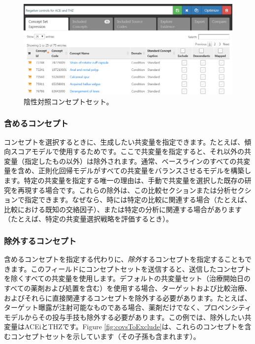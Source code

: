 \documentclass[
  11pt]{book}
\theoremstyle{definition}
\theoremstyle{definition}
\theoremstyle{definition}
\theoremstyle{definition}
\theoremstyle{remark}
\begin{document}
\begin{figure}

{\centering \includegraphics[width=1\linewidth]{images/PopulationLevelEstimation/ncConceptSet} 

}

\caption{陰性対照コンセプトセット。}\label{fig:ncConceptSet}
\end{figure}

\subsubsection*{含めるコンセプト}\label{ux542bux3081ux308bux30b3ux30f3ux30bbux30d7ux30c8}

コンセプトを選択するときに、生成したい共変量を指定できます。たとえば、傾向スコアモデルで使用するためです。ここで共変量を指定すると、それ以外の共変量（指定したもの以外）は除外されます。通常、ベースラインのすべての共変量を含め、正則化回帰モデルがすべての共変量をバランスさせるモデルを構築します。特定の共変量を指定する唯一の理由は、手動で共変量を選択した既存の研究を再現する場合です。これらの除外は、この比較セクションまたは分析セクションで指定できます。なぜなら、時には特定の比較に関連する場合（たとえば、比較における既知の交絡因子）、または特定の分析に関連する場合があります（たとえば、特定の共変量選択戦略を評価するとき）。

\subsubsection*{除外するコンセプト}\label{ux9664ux5916ux3059ux308bux30b3ux30f3ux30bbux30d7ux30c8}

含めるコンセプトを指定する代わりに、\emph{除外}するコンセプトを指定することもできます。このフィールドにコンセプトセットを送信すると、送信したコンセプトを除くすべての共変量を使用します。デフォルトの共変量セット（治療開始日のすべての薬剤および処置を含む）を使用する場合、ターゲットおよび比較治療、およびそれらに直接関連するコンセプトを除外する必要があります。たとえば、ターゲット曝露が注射可能なものである場合、薬剤だけでなく、プロペンシティモデルからその投与手技も除外する必要があります。この例では、除外したい共変量はACEiとTHZです。Figure \ref{fig:covsToExclude}は、これらのコンセプトを含むコンセプトセットを示しています（その子孫も含まれます）。
\end{document}
